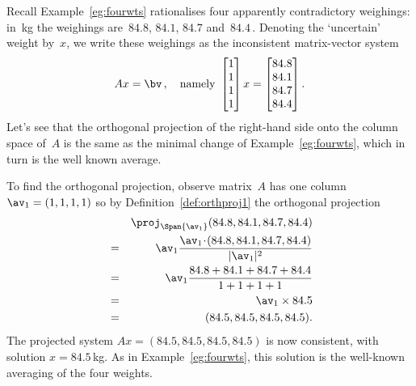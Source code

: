 \begin{example} \label{eg:fourwts2}
Recall Example~\ref{eg:fourwts} rationalises four apparently contradictory weighings: in~kg the weighings are~\(84.8\), \(84.1\), \(84.7\) and~\(84.4\)\,.
Denoting the `uncertain' weight by~\(x\),  we write these weighings as the inconsistent matrix-vector system
\begin{equation*}
Ax=\bv\,,\quad\text{namely }
\begin{bmatrix} 1\\1\\1\\1 \end{bmatrix}x
=\begin{bmatrix} 84.8\\84.1\\84.7\\84.4 \end{bmatrix}.
\end{equation*}
Let's see that the orthogonal projection of the right-hand side onto the column space of~\(A\) is the same as the minimal change of Example~\ref{eg:fourwts}, which in turn is the well known average.

To find the orthogonal projection, observe matrix~\(A\) has one column \(\av_1=(1,1,1,1)\) so by Definition~\ref{def:orthproj1} the orthogonal projection
\begin{eqnarray*}
&&\proj_{\Span\{\av_1\}}(84.8,84.1,84.7,84.4)
\\&=&\av_1\frac{\av_1\cdot(84.8,84.1,84.7,84.4)}{|\av_1|^2}
\\&=&\av_1\frac{84.8+84.1+84.7+84.4}{1+1+1+1}
\\&=&\av_1\times 84.5
\\&=&(84.5,84.5,84.5,84.5).
\end{eqnarray*}
The projected system \(Ax=(84.5,84.5,84.5,84.5)\) is now consistent, with solution \(x=84.5\)\,kg.
As in Example~\ref{eg:fourwts}, this solution is the well-known averaging of the four weights.
\end{example}



